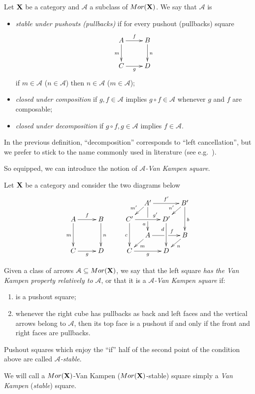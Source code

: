 \documentclass[a4paper,UKenglish,cleveref,pdftex, thm-restate,numberwithinsect]{lipics}
\newcommand{\mor}{\mathsf{Mor}}
\def\C{\textbf {\textup{C}}}
\def\X{\textbf {\textup{X}}}
\begin{document}
\begin{definition}
	Let $\X$ be a category and $\mathcal{A}$ a  subclass of $\mor(\X)$. We say that  $\mathcal{A}$ is
	\begin{itemize}
		\item 
		\emph{stable under pushouts (pullbacks)} if for every pushout (pullbacks) square 
		\[\xymatrix{A\ar[r]^f  \ar[d]_{m}& B \ar[d]^n \\ C \ar[r]_g & D}\]
		if $m \in \mathcal{A}$ ($n\in \mathcal{A}$) then $n \in \mathcal{A}$ ($m \in \mathcal{A}$);
		\item \emph{closed under composition} if $g, f\in \mathcal{A}$ implies $g\circ f\in \mathcal{A}$ whenever $g$ and $f$ are composable;
		\item \emph{closed under decomposition} if $g\circ f, g\in \mathcal{A}$ implies $f\in \mathcal{A}$.
	\end{itemize}
\end{definition}

\begin{remark}In the previous definition, ``decomposition'' corresponds to ``left cancellation'', but we prefer to stick to the name commonly used in literature (see e.g.~\cite{habel2012mathcal}).
\end{remark}


So equipped, we can introduce the notion of \emph{$\mathcal{A}$-Van Kampen square}.
\begin{definition} Let $\X$ be a category  and consider the two diagrams below
	\[\xymatrix@C=10pt@R=10pt{&&&&&A'\ar[dd]|\hole_(.65){a}\ar[rr]^{f'} \ar[dl]_{m'} && B' \ar[dd]^{b} \ar[dl]_{n'} \\ A \ar[dd]_{m}\ar[rr]^{f}&&B\ar[dd]^{n}&&C'  \ar[dd]_{c}\ar[rr]^(.7){g'} & & D' \ar[dd]_(.3){d}\\&&&&&A\ar[rr]|\hole^(.65){f} \ar[dl]^{m} && B \ar[dl]^{n} \\C\ar[rr]_{g} &&D&&C \ar[rr]_{g} & & D}\]
	
	Given  a class of arrows $\mathcal{A}\subseteq \mor(\X)$, we say that the left square \emph{has the Van Kampen property relatively to $\mathcal{A}$}, or that it  is a \emph{$\mathcal{A}$-Van Kampen square} if:
	\begin{enumerate}
		\item is a pushout square;
		\item 	whenever the right cube has pullbacks as back and left faces and the vertical arrows belong to $\mathcal{A}$, then its top face is a pushout if and only if the front and right faces are pullbacks.
	\end{enumerate}
	Pushout squares which enjoy the ``if'' half of the second point of the condition above are called \emph{$\mathcal{A}$-stable}. 
	
We will call a $\mor(\X)$-Van Kampen ($\mor(\X)$-stable) square simply a \emph{Van Kampen} (\emph{stable}) square.
\end{definition}
\end{document}
